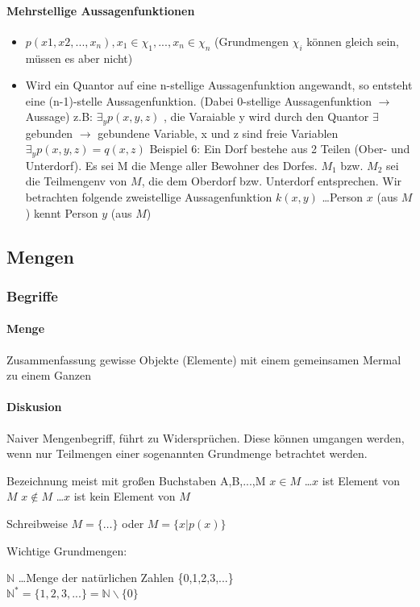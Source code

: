 \documentclass[a4paper]{scrartcl}
\begin{document}
\paragraph{Mehrstellige Aussagenfunktionen}
\begin{itemize}
\item $p (x1,x2,...,x_n), x_1 \in \chi_1,...,x_n\in \chi_n$
(Grundmengen $\chi_i$ können gleich sein, müssen es aber nicht)
\item Wird ein Quantor auf eine n-stellige Aussagenfunktion angewandt, so entsteht eine (n-1)-stelle Aussagenfunktion. (Dabei 0-stellige Aussagenfunktion $\rightarrow$ Aussage)
z.B: $\exists_y p(x,y,z)$ , die Varaiable y wird durch den Quantor $\exists$ gebunden $\rightarrow$ gebundene Variable, x und z sind freie Variablen $\exists_y p(x,y,z) = q(x,z)$
Beispiel 6: Ein Dorf bestehe aus 2 Teilen (Ober- und Unterdorf). Es sei M die Menge aller Bewohner des Dorfes. $M_1$ bzw. $M_2$ sei die Teilmengenv von $M$, die dem Oberdorf bzw. Unterdorf entsprechen. Wir betrachten folgende zweistellige Aussagenfunktion
$k(x,y)$ \dots Person $x$ (aus $M$) kennt Person $y$ (aus $M$)
\end{itemize}
\subsection{Mengen}%
\subsubsection{Begriffe}%
\paragraph{Menge} Zusammenfassung gewisse Objekte (Elemente) mit einem gemeinsamen Mermal zu einem Ganzen
\paragraph{Diskusion} Naiver Mengenbegriff, führt zu Widersprüchen. Diese können umgangen werden, wenn nur Teilmengen einer sogenannten Grundmenge betrachtet werden.

Bezeichnung meist mit großen Buchstaben A,B,...,M
$x \in M$ \dots $x$ ist Element von $M$
$x \notin M$ \dots $x$ ist kein Element von $M$

Schreibweise $M=\{ \dots\}$ oder $M=\{ x \vert  p(x)\}$

Wichtige Grundmengen:

$\mathbb{N}$ \dots Menge der natürlichen Zahlen \{0,1,2,3,...\} \\
$\mathbb{N}^* = \{1,2,3,...\} = \mathbb{N} \backslash \{0\}$
\end{document}
